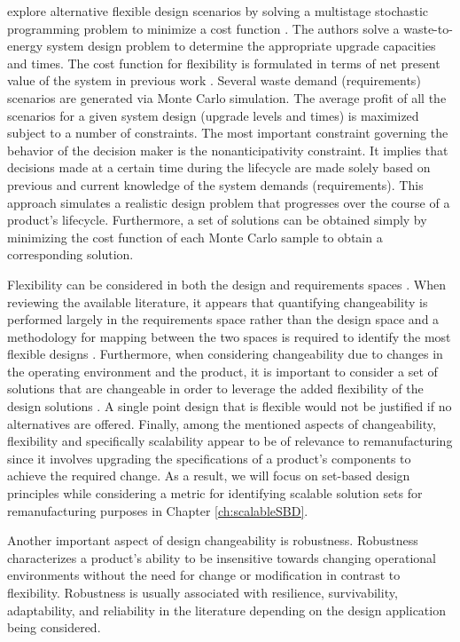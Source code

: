 \citeauthor{Cardin2017} explore alternative flexible design scenarios by solving a multistage stochastic programming problem to minimize a cost function \cite{Cardin2017}. The authors solve a waste-to-energy system design problem to determine the appropriate upgrade capacities and times. The cost function for flexibility is formulated in terms of net present value of the system in previous work \cite{Cardin2016}. Several waste demand (requirements) scenarios are generated via Monte Carlo simulation. The average profit of all the scenarios for a given system design (upgrade levels and times) is maximized subject to a number of constraints. The most important constraint governing the behavior of the decision maker is the nonanticipativity constraint. It implies that decisions made at a certain time during the lifecycle are made solely based on previous and current knowledge of the system demands (requirements). This approach simulates a realistic design problem that progresses over the course of a product's lifecycle. Furthermore, a set of solutions can be obtained simply by minimizing the cost function of each Monte Carlo sample to obtain a corresponding solution.

Flexibility can be considered in both the design and requirements spaces \cite{Ferguson2008}. When reviewing the available literature, it appears that quantifying changeability is performed largely in the requirements space rather than the design space and a methodology for mapping between the two spaces is required to identify the most flexible designs \cite{Tackett2014,Olewnik2004,Liu2008,Yannou2003}. Furthermore, when considering changeability due to changes in the operating environment and the product, it is important to consider a set of solutions that are changeable in order to leverage the added flexibility of the design solutions \cite{Olewnik2004,Liu2008,Suh2007}. A single point design that is flexible would not be justified if no alternatives are offered. Finally, among the mentioned aspects of changeability, flexibility and specifically scalability appear to be of relevance to remanufacturing since it involves upgrading the specifications of a product's components to achieve the required change. As a result, we will focus on set-based design principles while considering a metric for identifying scalable solution sets for remanufacturing purposes in Chapter \ref{ch:scalableSBD}.

Another important aspect of design changeability is robustness. Robustness characterizes a product's ability to be insensitive towards changing operational environments without the need for change or modification in contrast to flexibility. Robustness is usually associated with resilience, survivability, adaptability, and reliability in the literature depending on the design application being considered. 

